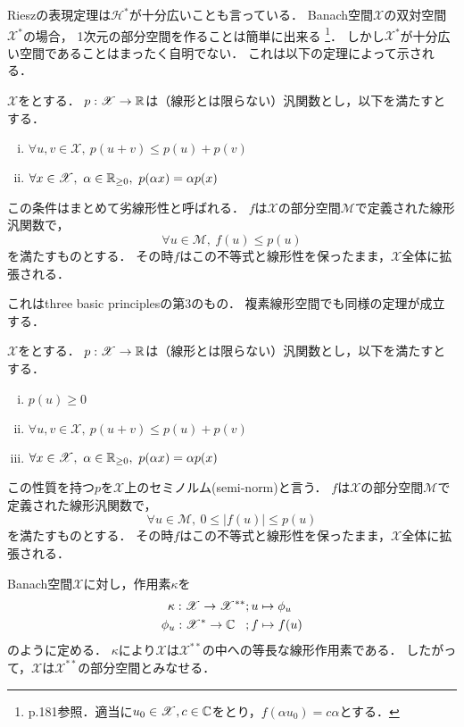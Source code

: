\documentclass[a4j]{jarticle}
\newcommand{\spX}{\mathscr{X}}
\begin{document}
    Rieszの表現定理は$\mathscr{H}^{\ast}$が十分広いことも言っている．
    Banach空間$\spX$の双対空間$\spX^{\ast}$の場合，
    1次元の部分空間を作ることは簡単に出来る
    \footnote{p.181参照．適当に$u_0 \in \spX, c \in \C$をとり，$f(\alpha u_0)=c \alpha$とする．}．
    しかし$\spX^{\ast}$が十分広い空間であることはまったく自明でない．
    これは以下の定理によって示される．
    \begin{Them} \label{them8:11}
        $\spX$をとする．
        $p:\spX \to \R$は（線形とは限らない）汎関数とし，以下を満たすとする．
        \begin{enumerate}[i)]
            \setlength{\leftskip}{5truemm}
            \item $\forall u, v \in \spX,~ p(u+v) \leq p(u)+p(v)$ 
            \item $\forall x \in \spX,~ \alpha \in \R_{\geq 0},~ p(\alpha x) = \alpha p(x)$
        \end{enumerate}
        この条件はまとめて劣線形性と呼ばれる．
        $f$は$\spX$の部分空間$\mathscr{M}$で定義された線形汎関数で，
        \[ \forall u \in \mathscr{M},~ f(u) \leq p(u) \]
        を満たすものとする．
        その時$f$はこの不等式と線形性を保ったまま，$\spX$全体に拡張される．
    \end{Them}
    これはthree basic principlesの第3のもの．
    複素線形空間でも同様の定理が成立する．

    \begin{Them}[定理8.13, p.184] \label{them8:13}
        $\spX$をとする．
        $p:\spX \to \R$は（線形とは限らない）汎関数とし，以下を満たすとする．
        \begin{enumerate}[i)]
            \setlength{\leftskip}{5truemm}
            \item $p(u) \geq 0$
            \item $\forall u, v \in \spX,~ p(u+v) \leq p(u)+p(v)$ 
            \item $\forall x \in \spX,~ \alpha \in \R_{\geq 0},~ p(\alpha x) = \alpha p(x)$
        \end{enumerate}
        この性質を持つ$p$を$\spX$上のセミノルム(semi-norm)と言う．
        $f$は$\spX$の部分空間$\mathscr{M}$で定義された線形汎関数で，
        \[ \forall u \in \mathscr{M},~ 0 \leq |f(u)| \leq p(u) \]
        を満たすものとする．
        その時$f$はこの不等式と線形性を保ったまま，$\spX$全体に拡張される．
    \end{Them}

    \begin{Them}[定理8.23, p.189] \label{them8:23}
        Banach空間$\spX$に対し，作用素$\kappa$を
        \begin{align*}
            \kappa: \spX \to \spX^{\ast \ast}     &;u \mapsto \phi_{u} \\
            \phi_u: \mathscr{X^{\ast}} \to \C \hspace{3truemm}&;f \mapsto f(u)
        \end{align*}
        のように定める．
        $\kappa$により$\spX$は$\spX^{\ast \ast}$の中への等長な線形作用素である．
        したがって，$\spX$は$\spX^{\ast \ast}$の部分空間とみなせる．
    \end{Them}

\end{document}
